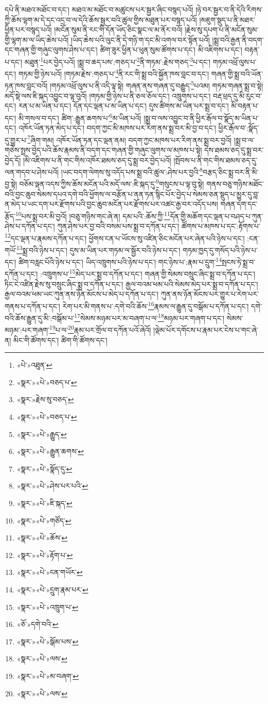དཔེ་ནི་མཐའ་མཐོང་བ་དང་། མཐའ་མ་མཐོང་བ་མཚུངས་པར་སྦྱར་ཞིང་བསྙད་པའོ། །ཉེ་བར་སྦྱར་བ་ནི་དེའི་རིགས་ཀྱི་ཆོས་ལྷག་མ་དེ་དང་འདྲ་བ་ལ་དེའི་ཆོས་སྦྱར་བའི་ཚུལ་གྱིས་མཐུན་པར་བསྙད་པའོ། །མཇུག་སྡུད་པ་ནི་མཐར་ཕྱིན་པར་བསྙད་པའོ། །མངོན་སུམ་ནི་རང་གི་དོན་ཡོད་ཅིང་སྣང་ལ་མ་ནོར་བའོ། །རྗེས་སུ་དཔག་པ་ནི་མངོན་སུམ་གྱི་ལྷག་མ་ལ་ཡིད་ཆེས་པའོ། །ཡིད་ཆེས་པའི་ལུང་ནི་དེ་གཉི་ག་དང་མི་འགལ་བར་སྟོན་པའོ། །སྨྲ་བའི་རྒྱན་ནི་བདག་དང་གཞན་གྱི་གཞུང་ལུགས་ཤེས་པ་དང་། ཚིག་ཟུར་ཕྱིན་པ་ཕུན་སུམ་ཚོགས་པ་དང་། མི་འཇིགས་པ་དང་། བརྟན་པ་དང་། མཐུན་\footnote{«པེ་»འཐུན་}པར་བྱེད་པའོ། །སྨྲ་བ་ཆད་པས་:གཅད་པ་\footnote{«སྣར་»«པེ་»བཅད་པ་}ནི་གཏམ་:རྗེས་གཅད་\footnote{«སྣར་»རྗེས་སུ་བཅད་}པ་དང་། གཏམ་འཕྲོ་ལུས་པ་དང་། གཏམ་གྱི་ཉེས་པའོ། །གཏམ་རྗེས་:གཅད་པ་\footnote{«སྣར་»«པེ་»བཅད་པ་}ནི་རང་གི་སྨྲ་བའི་སྐྱོན་ཁས་བླང་བ་དང་། གཞན་གྱི་སྨྲ་བའི་ཡོན་ཏན་ཁས་བླང་བའོ། །གཏམ་འཕྲོ་ལུས་པ་ནི་འདི་ལྟ་སྟེ། གཞན་ནས་གཞན་དུ་བརྒྱུད་\footnote{«སྣར་»«པེ་»རྒྱུད་}པའམ། གཏམ་གཞན་སྨྲ་བ་སྟེ། མདོ་སྡེ་ལས་ཇི་སྐད་འབྱུང་བ་ལྟ་བུའོ། །གཏམ་གྱི་ཉེས་པ་ནི་ཅལ་ཅོལ་དང་། འཁྲུགས་པ་དང་། བརྡ་ཕྲད་དུ་མི་རུང་བ་དང་། རན་པ་མ་ཡིན་པ་དང་། དོན་དང་ལྡན་པ་མ་ཡིན་པ་དང་། དུས་ཚིགས་མ་ཡིན་པར་སྨྲ་བ་དང་། མི་བརྟན་པ་དང་། མི་གསལ་བ་དང་། ཚིག་:རྒྱུན་ཆགས་པ་\footnote{«སྣར་»«པེ་»རྒྱུན་ཆགས་}མ་ཡིན་པའོ། །སྨྲ་བ་ལས་འབྱུང་བ་ནི་ཕྱིར་རྒོལ་བ་སྣོད་མ་ཡིན་པ་དང་། འཁོར་ཡོན་ཏན་མེད་པ་དང་། བདག་ཀྱང་མི་མཁས་པར་རིག་ནས་སྨྲ་བར་མི་བྱ་བ་དང་། ཕྱིར་རྒོལ་བ་:སྣོད་དུ་གྱུར་པ་\footnote{«སྣར་»«པེ་»སྣོད་དུ་}ཞིག་གམ། འཁོར་ཡོན་ཏན་དང་ལྡན་ནམ། བདག་ཀྱང་མཁས་པར་རིག་ནས་སྨྲ་བར་བྱའོ། །སྨྲ་བ་ལ་གཅེས་སྤྲས་བྱེད་པའི་ཆོས་རྣམས་ནི་བདག་དང་གཞན་གྱི་གཞུང་ལུགས་ལ་མཁས་པ་སྟེ། དེས་ཐམས་ཅད་དུ་སྨྲ་བར་བྱེད་དོ། །མི་འཇིགས་པ་ནི་གང་གིས་འཁོར་ཐམས་ཅད་དུ་སྨྲ་བར་བྱེད་པའོ། །སྤོབས་པ་ནི་གང་གིས་ཐམས་ཅད་དུ་ལན་གདབ་པ་ཤེས་པའོ། །ཡང་བདག་ལེགས་སུ་འདོད་པས་སྨྲ་བའི་ཚུལ་:ཤེས་པར་བྱའི་\footnote{«སྣར་»«པེ་»ཤེས་པར་པའི་}བརྩད་ཅིང་སྨྲ་བར་ནི་མི་བྱ་སྟེ། བཅོམ་ལྡན་འདས་ཀྱིས་ཆོས་མངོན་པའི་མདོ་ལས་:ཇི་སྐད་དུ་\footnote{«སྣར་»«པེ་»ཇི་སྐད་}གསུངས་པ་ལྟ་བུ་སྟེ། གནས་བཅུ་གཉིས་མཐོང་བའི་བྱང་ཆུབ་སེམས་དཔའ་དགེ་བའི་ཕྱོགས་ལ་བརྩོན་པ་ནན་ཏན་སྙིང་པོར་བྱེད་པ་སེམས་ཅན་སྡུད་པ་མྱུར་དུ་བླ་ན་མེད་པ་ཡང་དག་པར་རྫོགས་པའི་བྱང་ཆུབ་མངོན་པར་རྫོགས་པར་འཚང་རྒྱ་བར་འདོད་པས། གཞན་དག་དང་རྩོད་\footnote{«སྣར་»«པེ་»གཙོད་}པས་སྨྲ་བར་མི་བྱའོ། །བཅུ་གཉིས་གང་ཞེ་ན། དམ་པའི་:ཆོས་ཀྱི་\footnote{«སྣར་»«པེ་»ཆོས་}དོན་གྱི་མཆོག་དང་ལྡན་པ་བཤད་པ་ཀུན་ཤེས་པ་དཀོན་པ་དང་། ཀུན་ཤེས་པར་བྱ་བའི་བསམ་པས་སྨྲ་བ་དཀོན་པ་དང་། ཚོགས་པ་མཁས་པ་དང་:རྟོགས་པ་\footnote{«སྣར་»«པེ་»རྟོག་པ་}དང་ལྡན་པ་རྣམས་དཀོན་པ་དང་། ཕྱོགས་ངན་པ་ཡོངས་སུ་འཛིན་ཅིང་མངོན་པར་ཞེན་པའི་ཉེས་པ་དང་། :ངན་གཡོ་\footnote{«སྣར་»«པེ་»ངན་གཡོར་}སྨྲ་བའི་ཉེས་པ་དང་། དུས་མ་ཡིན་པར་གཏམ་ལ་སྦྱོར་བའི་ཉེས་པ་དང་། གཏམ་ཁྱད་དུ་གསོད་པའི་ཉེས་པ་དང་། ཚིག་བརླང་པོའི་ཉེས་པ་དང་། ཡིད་འཁྲུགས་པའི་ཉེས་པ་དང་། གང་ཉེས་པ་:རྣམ་པ་དྲུག་\footnote{«སྣར་»«པེ་»དྲུག་རྣམ་པར་}སྤངས་ཏེ་སྨྲ་བ་དཀོན་པ་དང་། :འཁྲུགས་པ་\footnote{«སྣར་»«པེ་»འཁྲུག་པ་}མེད་པར་སྨྲ་བ་དཀོན་པ་དང་། གཞན་གྱི་སེམས་བསྲུང་ཞིང་སྨྲ་བ་དཀོན་པ་དང་། ཏིང་ངེ་འཛིན་རྗེས་སུ་བསྲུང་ཞིང་སྨྲ་བ་དཀོན་པ་དང་། རྒྱལ་བའམ་ཕམ་པའི་སེམས་མེད་པར་སྨྲ་བ་དཀོན་པ་དང་། རྒྱལ་བའམ་ཕམ་ཡང་ཀུན་ནས་ཉོན་མོངས་པ་མེད་པ་དཀོན་པ་དང་། ཀུན་ནས་ཉོན་མོངས་པར་གྱུར་པ་རེག་པར་གནས་པ་དཀོན་པ་དང་། རེག་པར་མི་གནས་པ་:དགེ་བའི་ཆོས་\footnote{«ཅོ་»དགེ་བའི་}རྣམས་ལ་རྒྱུན་དུ་བསྒོམ་པ་དཀོན་པ་དང་། དགེ་བའི་ཆོས་རྒྱུན་དུ་མི་:བསྒོམ་པ་\footnote{«སྣར་»«པེ་»སྒོམ་པས་}སེམས་མཉམ་པར་མ་བཞག་པ་ལ་\footnote{«སྣར་»«པེ་»ལས་}མཉམ་པར་གཞག་པ་དང་། སེམས་མཉམ་:པར་གཞག་\footnote{«སྣར་»«པེ་»མ་བཞག་}པ་ལ་\footnote{«སྣར་»«པེ་»ལས་}རྣམ་པར་གྲོལ་བ་དཀོན་པའོ་ཞེའོ། །ལྡེམ་པོར་དགོངས་པ་རྣམ་པར་ངེས་པ་གང་ཞེ་ན། མིང་གི་ཚོགས་དང་། ཚིག་གི་ཚོགས་དང་། 